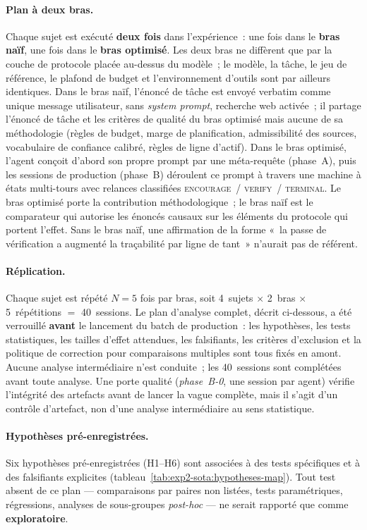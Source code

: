 \documentclass[a4paper,11pt]{report}
\begin{document}
\paragraph{Plan à deux bras.} Chaque sujet est exécuté \textbf{deux fois} dans l'expérience~: une fois dans le \textbf{bras naïf}, une fois dans le \textbf{bras optimisé}. Les deux bras ne diffèrent que par la couche de protocole placée au-dessus du modèle~; le modèle, la tâche, le jeu de référence, le plafond de budget et l'environnement d'outils sont par ailleurs identiques. Dans le bras naïf, l'énoncé de tâche est envoyé verbatim comme unique message utilisateur, sans \emph{system prompt}, recherche web activée~; il partage l'énoncé de tâche et les critères de qualité du bras optimisé mais aucune de sa méthodologie (règles de budget, marge de planification, admissibilité des sources, vocabulaire de confiance calibré, règles de ligne d'actif). Dans le bras optimisé, l'agent conçoit d'abord son propre prompt par une méta-requête (phase~A), puis les sessions de production (phase~B) déroulent ce prompt à travers une machine à états multi-tours avec relances classifiées \textsc{encourage}~/ \textsc{verify}~/ \textsc{terminal}. Le bras optimisé porte la contribution méthodologique~; le bras naïf est le comparateur qui autorise les énoncés causaux sur les éléments du protocole qui portent l'effet. Sans le bras naïf, une affirmation de la forme «~la passe de vérification a augmenté la traçabilité par ligne de tant~» n'aurait pas de référent.

\paragraph{Réplication.} Chaque sujet est répété $N{=}5$ fois par bras, soit 4~sujets $\times$ 2~bras $\times$ 5~répétitions $=$ 40~sessions. Le plan d'analyse complet, décrit ci-dessous, a été verrouillé \textbf{avant} le lancement du batch de production~: les hypothèses, les tests statistiques, les tailles d'effet attendues, les falsifiants, les critères d'exclusion et la politique de correction pour comparaisons multiples sont tous fixés en amont. Aucune analyse intermédiaire n'est conduite~; les 40~sessions sont complétées avant toute analyse. Une porte qualité (\emph{phase~B-0}, une session par agent) vérifie l'intégrité des artefacts avant de lancer la vague complète, mais il s'agit d'un contrôle d'artefact, non d'une analyse intermédiaire au sens statistique.

\paragraph{Hypothèses pré-enregistrées.} Six hypothèses pré-enregistrées (H1--H6) sont associées à des tests spécifiques et à des falsifiants explicites (tableau~\ref{tab:exp2-sota:hypotheses-map}). Tout test absent de ce plan --- comparaisons par paires non listées, tests paramétriques, régressions, analyses de sous-groupes \emph{post-hoc} --- ne serait rapporté que comme \textbf{exploratoire}.
\end{document}
